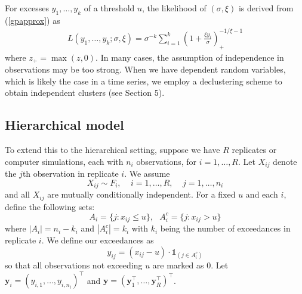 \documentclass[12pt]{article}
\newcommand{\ind}{\mathds{1}}
\newcommand{\m}[1]{\mathbf{\bm{#1}}}
\begin{document}
For excesses $y_1,\ldots,y_k$ of a threshold $u$, the likelihood of $(\sigma,\xi)$ is derived from (\ref{gpapprox}) as
\begin{align}
L(y_1,\ldots,y_k;\sigma,\xi)=\sigma^{-k}\sum_{i=1}^k\left(1+\frac{\xi y_i}{\sigma}\right)_+^{-1/\xi-1}
\end{align}
where $z_+=\max(z,0)$. In many cases, the assumption of independence in observations may be too strong. When we have dependent random variables, which is likely the case in a time series, we employ a declustering scheme to obtain independent clusters (see Section 5).
\bigskip


\subsection{Hierarchical model}

To extend this to the hierarchical setting, suppose we have $R$ replicates or computer simulations, each with $n_i$ observations, for $i=1,\ldots,R$. Let $X_{ij}$ denote the $j$th observation in replicate $i$. We assume
\[ X_{ij} \sim F_i,~~~~~i=1,\ldots,R,~~~~~j=1,\ldots,n_i \]
and all $X_{ij}$ are mutually conditionally independent. For a fixed $u$ and each $i$, define the following sets:
\[ A_i = \{j:x_{ij}\leq u\},~~~ A_i^c = \{j: x_{ij}>u\} \]
where $|A_i|=n_i-k_i$ and $|A_i^c|=k_i$ with $k_i$ being the number of exceedances in replicate $i$. We define our exceedances as
\[ y_{ij} = (x_{ij}-u)\cdot \ind_{(j \in A_i^c)} \]
so that all observations not exceeding $u$ are marked as $0$. Let $\m{y}_i=(y_{i,1},\ldots,y_{i,n_i})^\top$ and $\m{y}=(\m{y}_1^\top,\ldots,\m{y}_R^\top)^\top$.
\bigskip
\end{document}
